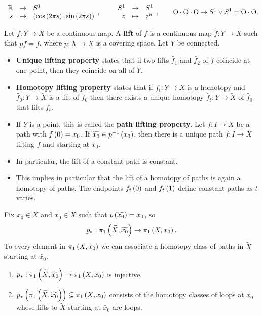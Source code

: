 \begin{example*}
$$ \function{\R}{S^1}{s}{\rb{\cos\rb{2\pi s}, \sin\rb{2\pi s}}}, \qquad \function{S^1}{S^1}{z}{z^n}, \qquad \text{O} \cdot \text{O} \cdot \text{O} \to S^1 \vee S^1 = \text{O} \cdot \text{O}. $$
\end{example*}

Let $ f : Y \to X $ be a continuous map. A \textbf{lift} of $ f $ is a continuous map $ \widetilde{f} : Y \to \widetilde{X} $ such that $ p\widetilde{f} = f $, where $ p : \widetilde{X} \to X $ is a covering space. Let $ Y $ be connected.
\begin{itemize}
\item \textbf{Unique lifting property} states that if two lifts $ \widetilde{f_1} $ and $ \widetilde{f_2} $ of $ f $ coincide at one point, then they coincide on all of $ Y $.
\item \textbf{Homotopy lifting property} states that if $ f_t : Y \to X $ is a homotopy and $ \widetilde{f_0} : Y \to \widetilde{X} $ is a lift of $ f_0 $ then there exists a unique homotopy $ \widetilde{f_t} : Y \to \widetilde{X} $ of $ \widetilde{f_0} $ that lifts $ f_t $.
\end{itemize}

\begin{remark*}
\hfill
\begin{itemize}
\item If $ Y $ is a point, this is called the \textbf{path lifting property}. Let $ f : I \to X $ be a path with $ f\left( 0 \right) = x_0 $. If $ \widetilde{x_0} \in p^{-1}\left( x_0 \right) $, then there is a unique path $ \widetilde{f} : I \to \widetilde{X} $ lifting $ f $ and starting at $ \widetilde{x_0} $.
\item In particular, the lift of a constant path is constant.
\item This implies in particular that the lift of a homotopy of paths is again a homotopy of paths. The endpoints $ f_t\left( 0 \right) $ and $ f_t\left( 1 \right) $ define constant paths as $ t $ varies.
\end{itemize}
\end{remark*}

Fix $ x_0 \in X $ and $ \widetilde{x_0} \in \widetilde{X} $ such that $ p\left( \widetilde{x_0} \right) = x_0 $, so
$$ p_* : \pi_1\left( \widetilde{X}, \widetilde{x_0} \right) \to \pi_1\left( X, x_0 \right). $$
To every element in $ \pi_1\left( X, x_0 \right) $ we can associate a homotopy class of paths in $ \widetilde{X} $ starting at $ \widetilde{x_0} $.

\begin{proposition}
\label{prop:1.31}
\hfill
\begin{enumerate}
\item $ p_* : \pi_1\left( \widetilde{X}, \widetilde{x_0} \right) \to \pi_1\left( X, x_0 \right) $ is injective.
\item $ p_*\left( \pi_1\left( \widetilde{X}, \widetilde{x_0} \right) \right) \subseteq \pi_1\left( X, x_0 \right) $ consists of the homotopy classes of loops at $ x_0 $ whose lifts to $ \widetilde{X} $ starting at $ \widetilde{x_0} $ are loops.
\end{enumerate}
\end{proposition}


